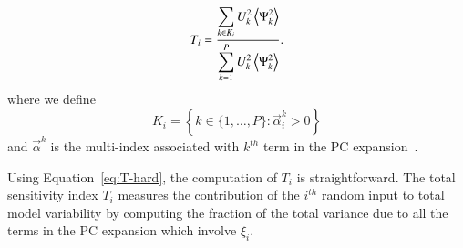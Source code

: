 \begin{equation} \label{eq:T-hard}
   T_i =
         \frac{\displaystyle
               \sum_{k \in K_i} U_k^2 \left\langle {\Psi_k^2} \right\rangle}
              {\displaystyle\sum_{k = 1}^P U_k^2 \left\langle {\Psi_k^2} \right\rangle} .
\end{equation}
where we define \[
   K_i = \left\{ k \in \{1, \ldots, P\} :
           \vec{\alpha}^k_i > 0 \right\}
        \]
        and $\vec{\alpha}^k$ is the
multi-index associated with $k^{th}$ term in the
PC expansion~\cite{LeMaitreKnio2010}.

Using Equation~\eqref{eq:T-hard}, the computation of $T_i$ is straightforward.
The total sensitivity index $T_i$ measures the contribution of
the $i^{th}$ random input to total model variability by
computing the fraction of the total variance due to all the terms in the
PC expansion which involve $\xi_i$.


